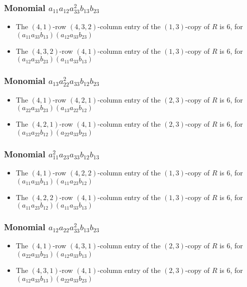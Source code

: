 \documentclass{article}
\begin{document}
\subsubsection{Monomial $ a_{11} a_{12} a_{33}^{2} b_{13} b_{23} $}

\begin{itemize}
\item The $(4, 1)$-row $(4, 3, 2)$-column entry of the $ \left(1, 3\right) $-copy of $R$ is $ 6 $, for $( a_{11} a_{33} b_{13} )( a_{12} a_{33} b_{23} )$ 
\item The $(4, 3, 2)$-row $(4, 1)$-column entry of the $ \left(1, 3\right) $-copy of $R$ is $ 6 $, for $( a_{12} a_{33} b_{23} )( a_{11} a_{33} b_{13} )$ 
\end{itemize}
\subsubsection{Monomial $ a_{13} a_{22}^{2} a_{33} b_{12} b_{23} $}

\begin{itemize}
\item The $(4, 1)$-row $(4, 2, 1)$-column entry of the $ \left(2, 3\right) $-copy of $R$ is $ 6 $, for $( a_{22} a_{33} b_{23} )( a_{13} a_{22} b_{12} )$ 
\item The $(4, 2, 1)$-row $(4, 1)$-column entry of the $ \left(2, 3\right) $-copy of $R$ is $ 6 $, for $( a_{13} a_{22} b_{12} )( a_{22} a_{33} b_{23} )$ 
\end{itemize}
\subsubsection{Monomial $ a_{11}^{2} a_{23} a_{33} b_{12} b_{13} $}

\begin{itemize}
\item The $(4, 1)$-row $(4, 2, 2)$-column entry of the $ \left(1, 3\right) $-copy of $R$ is $ 6 $, for $( a_{11} a_{33} b_{13} )( a_{11} a_{23} b_{12} )$ 
\item The $(4, 2, 2)$-row $(4, 1)$-column entry of the $ \left(1, 3\right) $-copy of $R$ is $ 6 $, for $( a_{11} a_{23} b_{12} )( a_{11} a_{33} b_{13} )$ 
\end{itemize}
\subsubsection{Monomial $ a_{12} a_{22} a_{33}^{2} b_{13} b_{23} $}

\begin{itemize}
\item The $(4, 1)$-row $(4, 3, 1)$-column entry of the $ \left(2, 3\right) $-copy of $R$ is $ 6 $, for $( a_{22} a_{33} b_{23} )( a_{12} a_{33} b_{13} )$ 
\item The $(4, 3, 1)$-row $(4, 1)$-column entry of the $ \left(2, 3\right) $-copy of $R$ is $ 6 $, for $( a_{12} a_{33} b_{13} )( a_{22} a_{33} b_{23} )$ 
\end{itemize}
\end{document}
